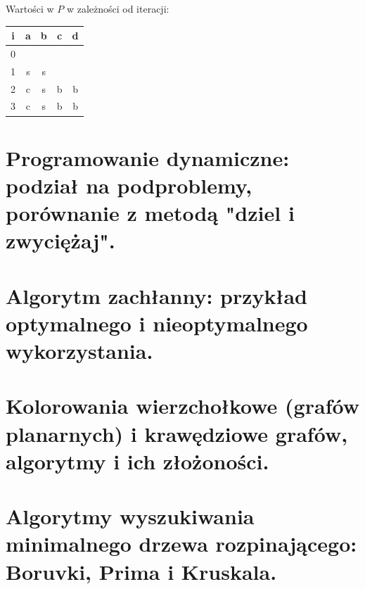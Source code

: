 \documentclass[12pt]{article}
\begin{document}
\begin{center}
                \[\]
                Wartości w $P$ w zależności od iteracji:

                \begin{tabular}{c||c|c|c|c}
                    i & a & b & c & d \\
                    \hline \hline
                    0 &   &   &  &  \\
                    \hline
                    1 & s & s &  &  \\
                    \hline
                    2 & c & s & b & b \\
                    \hline
                    3 & c & s & b & b \\
                \end{tabular} 
            \end{center}
        
        \newpage


    \section{Programowanie dynamiczne: podział na podproblemy, porównanie z metodą "dziel i zwyciężaj".}
    \section{Algorytm zachłanny: przykład optymalnego i nieoptymalnego wykorzystania.}
    
    \newpage
    
    \section{Kolorowania wierzchołkowe (grafów planarnych) i krawędziowe grafów, algorytmy i ich złożoności.}
    
    \newpage
    
    \section{Algorytmy wyszukiwania minimalnego drzewa rozpinającego: Boruvki, Prima i Kruskala.}
    
\end{document}
